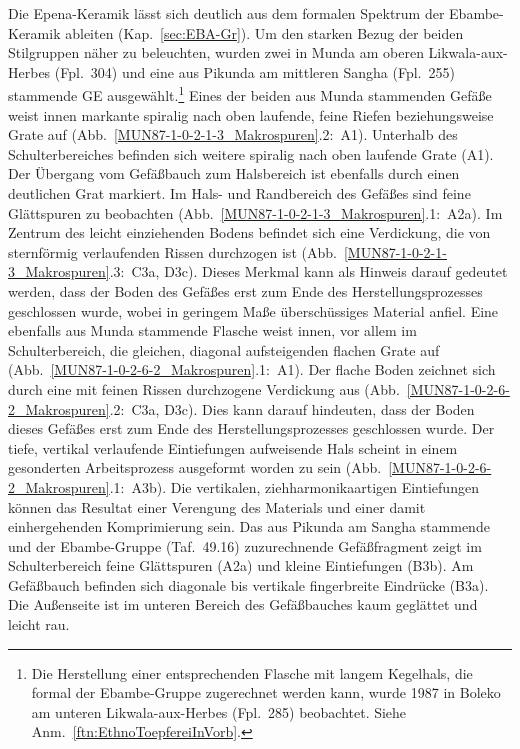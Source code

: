 \begin{multicols}{2}
Die Epena-Keramik lässt sich deutlich aus dem formalen Spektrum der Ebambe-Keramik ableiten (Kap.~\ref{sec:EBA-Gr}). Um den starken Bezug der beiden Stilgruppen näher zu beleuchten, wurden zwei in Munda am oberen \mbox{Likwala}-\mbox{aux}-\mbox{Herbes} (Fpl.~304) und eine aus Pikunda am mittleren \mbox{Sangha} (Fpl.~255) stammende GE ausgewählt.\footnote{Die Herstellung einer entsprechenden Flasche mit langem Kegelhals, die formal der Ebambe-Gruppe zugerechnet werden kann, wurde 1987 in Boleko am unteren \mbox{Likwala}-\mbox{aux}-\mbox{Herbes} (Fpl.~285) beobachtet. Siehe Anm.~\ref{ftn:EthnoToepfereiInVorb}.} Eines der beiden aus Munda stammenden Gefäße weist innen markante spiralig nach oben laufende, feine Riefen beziehungsweise Grate auf (Abb.~\ref{MUN87-1-0-2-1-3_Makrospuren}.2:~A1). Unterhalb des Schulterbereiches befinden sich weitere spiralig nach oben laufende Grate (A1). Der Übergang vom Gefäßbauch zum Halsbereich ist ebenfalls durch einen deutlichen Grat markiert. Im Hals- und Randbereich des Gefäßes sind feine Glättspuren zu beobachten (Abb.~\ref{MUN87-1-0-2-1-3_Makrospuren}.1:~A2a). Im Zentrum des leicht einziehenden Bodens befindet sich eine Verdickung, die von sternförmig verlaufenden Rissen durchzogen ist (Abb.~\ref{MUN87-1-0-2-1-3_Makrospuren}.3:~C3a, D3c). Dieses Merkmal kann als Hinweis darauf gedeutet werden, dass der Boden des Gefäßes erst zum Ende des Herstellungsprozesses geschlossen wurde, wobei in geringem Maße überschüssiges Material anfiel. Eine ebenfalls aus Munda stammende Flasche weist innen, vor allem im Schulterbereich, die gleichen, diagonal aufsteigenden flachen Grate auf (Abb.~\ref{MUN87-1-0-2-6-2_Makrospuren}.1:~A1). Der flache Boden zeichnet sich durch eine mit feinen Rissen durchzogene Verdickung aus (Abb.~\ref{MUN87-1-0-2-6-2_Makrospuren}.2:~C3a, D3c). Dies kann darauf hindeuten, dass der Boden dieses Gefäßes erst zum Ende des Herstellungsprozesses geschlossen wurde. Der tiefe, vertikal verlaufende Eintiefungen aufweisende Hals scheint in einem gesonderten Arbeitsprozess ausgeformt worden zu sein (Abb.~\ref{MUN87-1-0-2-6-2_Makrospuren}.1:~A3b). Die vertikalen, ziehharmonikaartigen Eintiefungen können das Resultat einer Verengung des Materials und einer damit einhergehenden Komprimierung sein. Das aus Pikunda am \mbox{Sangha} stammende und der Ebambe-Gruppe (Taf.~49.16) zuzurechnende Gefäßfragment zeigt im Schulterbereich feine Glättspuren (A2a) und kleine Eintiefungen (B3b). Am Gefäßbauch befinden sich diagonale bis vertikale fingerbreite Eindrücke (B3a). Die Außenseite ist im unteren Bereich des Gefäßbauches kaum geglättet und leicht rau.


\end{multicols}
